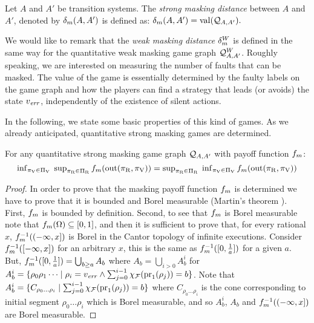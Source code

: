 \begin{defi} \label{def:mask_dist}
 Let $A$ and $A'$ be transition systems. 
The \emph{strong masking distance} between $A$ and $A'$, denoted by $\delta_{m}(A, A')$ is defined as:
$\delta_{m}(A, A') = \operatorname{val}(\mathcal{Q}_{A, A'}).$
\end{defi}

	We would like to remark that the \emph{weak masking distance} $\delta_{m}^W$ is defined in the same way 
for the quantitative weak masking game graph $\mathcal{Q}^W_{A,A'}$.  Roughly speaking, we are interested on 
measuring the number of faults that can be masked. The value of the game 
is essentially determined by the faulty labels on the game graph and how 
the players can find a strategy that leads (or avoids) the state $v_{\mathit{err}}$, independently of 
the existence of silent actions.

In the following, we state some basic properties of this kind of games. 
As we already anticipated, quantitative strong masking games are determined.

\begin{thm} \label{thm:mask_game_det}
  For any quantitative strong masking game graph $\mathcal{Q}_{A, A'}$ with payoff function $f_{m}$:
  \[\textstyle
  \inf_{\pi_{\mathrm{V}} \in \Pi_{\mathrm{V}}} \; \sup_{\pi_{\mathrm{R}} \in \Pi_{\mathrm{R}}} f_{m}(\operatorname{out}(\pi_{\mathrm{R}}, \pi_{\mathrm{V}})) = \sup_{\pi_{\mathrm{R}} \in \Pi_{\mathrm{R}}} \;  \inf_{\pi_{\mathrm{V}} \in \Pi_{\mathrm{V}}} f_{m}(\operatorname{out}(\pi_{\mathrm{R}}, \pi_{\mathrm{V}}))\]
\end{thm}
\begin{proof} In order to prove that the masking payoff function $f_{m}$ is determined we have to prove that it is bounded and Borel measurable (Martin's theorem \cite{Martin98}). First, $f_{m}$ is bounded by definition. Second, to see that $f_{m}$ is Borel measurable note that $f_{m}(\Omega) \subseteq [0,1]$, and then it is sufficient to prove that, for every rational $x$, $f_{m}^{-1}((-\infty, x])$ is  Borel in the Cantor topology of infinite executions. 
Consider $f_{m}^{-1}([-\infty,x])$ for an arbitrary $x$, this is the same as $f_{m}^{-1}([0, \frac{1}{a}])$ for a given $a$. But, $f_{m}^{-1}([0, \frac{1}{a}]) = \bigcup_{b \geq a} A_b$ where
$A_b = \bigcup_{i >0} A^i_b$ for $A^i_b = \{ \rho_0 \rho_1 \dots \mid \rho_i = v_{\mathit{err}} \wedge \sum^{i-1}_{j=0} \chi_{\mathcal{F}}(\operatorname{pr}_{1}(\rho_j)) =b\}$. Note that 
$A^i_b = \{ C_{\rho_0 \dots \rho_i} \mid \sum^{i-1}_{j=0} \chi_{\mathcal{F}}(\operatorname{pr}_{1}(\rho_j)) =b\}$ where $C_{\rho_0 \dots \rho_i}$ is the cone corresponding to initial segment 
$\rho_0 \dots \rho_i$ which is Borel measurable, and so $A^i_b$, $A_b$ and $f_{m}^{-1}((-\infty, x])$ are Borel measurable.
\qedhere
\end{proof} \\


